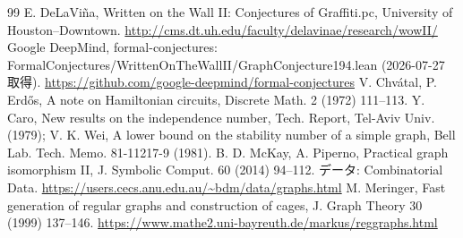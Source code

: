 \documentclass[paper=a4,fontsize=10.5pt,jafontsize=10.5pt]{jlreq}
\theoremstyle{plain}
\theoremstyle{definition}
\begin{document}
\begin{thebibliography}{99}
 E. DeLaViña, Written on the Wall II: Conjectures of Graffiti.pc, University of Houston--Downtown. \url{http://cms.dt.uh.edu/faculty/delavinae/research/wowII/}
 Google DeepMind, formal-conjectures: FormalConjectures/WrittenOnTheWallII/GraphConjecture194.lean (2026-07-27 取得). \url{https://github.com/google-deepmind/formal-conjectures}
 V. Chvátal, P. Erdős, A note on Hamiltonian circuits, Discrete Math. 2 (1972) 111--113.
 Y. Caro, New results on the independence number, Tech. Report, Tel-Aviv Univ. (1979); V. K. Wei, A lower bound on the stability number of a simple graph, Bell Lab. Tech. Memo. 81-11217-9 (1981).
 B. D. McKay, A. Piperno, Practical graph isomorphism II, J. Symbolic Comput. 60 (2014) 94--112. データ: Combinatorial Data. \url{https://users.cecs.anu.edu.au/~bdm/data/graphs.html}
 M. Meringer, Fast generation of regular graphs and construction of cages, J. Graph Theory 30 (1999) 137--146. \url{https://www.mathe2.uni-bayreuth.de/markus/reggraphs.html}
\end{thebibliography}
\end{document}
